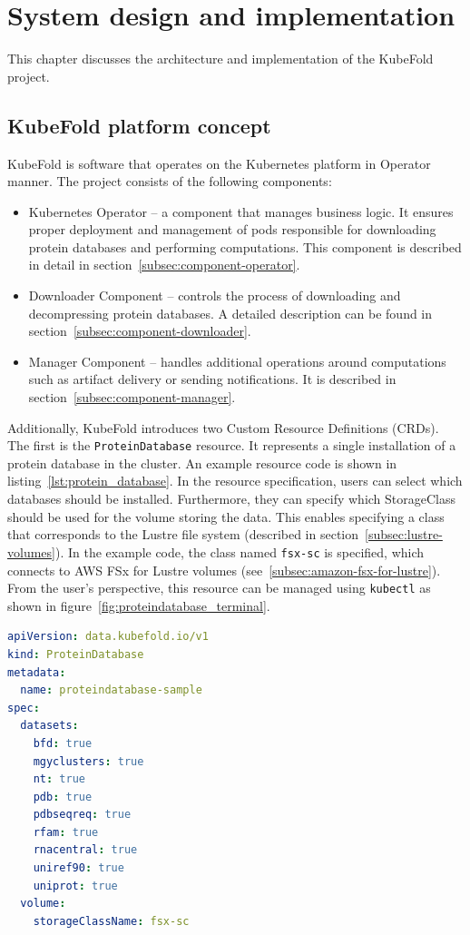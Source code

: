 

\chapter{System design and implementation}
This chapter discusses the architecture and implementation of the KubeFold project.


\section{KubeFold platform concept}
KubeFold is software that operates on the Kubernetes platform in Operator manner.
The project consists of the following components:
\begin{itemize}
    \item Kubernetes Operator -- a component that manages business logic.
    It ensures proper deployment and management of pods responsible for downloading protein databases and performing computations.
    This component is described in detail in section~\ref{subsec:component-operator}.
    \item Downloader Component -- controls the process of downloading and decompressing protein databases.
    A detailed description can be found in section~\ref{subsec:component-downloader}.
    \item Manager Component -- handles additional operations around computations such as artifact delivery or sending notifications.
    It is described in section~\ref{subsec:component-manager}.
\end{itemize}

Additionally, KubeFold introduces two Custom Resource Definitions (CRDs).
The first is the \texttt{ProteinDatabase} resource.
It represents a single installation of a protein database in the cluster.
An example resource code is shown in listing~\ref{lst:protein_database}.
In the resource specification, users can select which databases should be installed.
Furthermore, they can specify which StorageClass should be used for the volume storing the data.
This enables specifying a class that corresponds to the Lustre file system (described in section~\ref{subsec:lustre-volumes}).
In the example code, the class named \texttt{fsx-sc} is specified, which connects to AWS FSx for Lustre volumes (see~\ref{subsec:amazon-fsx-for-lustre}).
From the user's perspective, this resource can be managed using \texttt{kubectl} as shown in figure~\ref{fig:proteindatabase_terminal}.

\begin{lstlisting}[language=yaml,caption={Example \texttt{ProteinDatabase} resource definition},label={lst:protein_database}]
apiVersion: data.kubefold.io/v1
kind: ProteinDatabase
metadata:
  name: proteindatabase-sample
spec:
  datasets:
    bfd: true
    mgyclusters: true
    nt: true
    pdb: true
    pdbseqreq: true
    rfam: true
    rnacentral: true
    uniref90: true
    uniprot: true
  volume:
    storageClassName: fsx-sc
\end{lstlisting}

